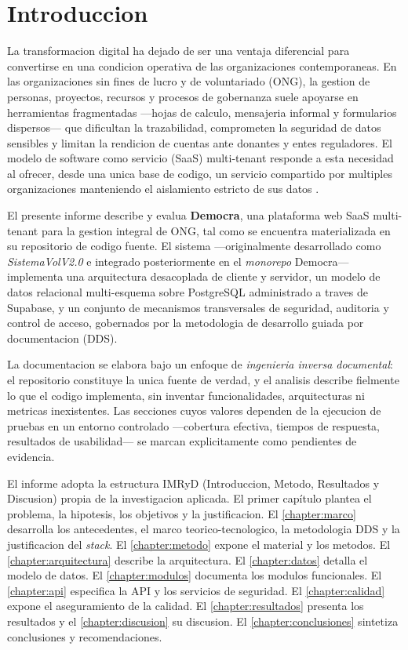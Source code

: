 \documentclass[11pt,a4paper,oneside]{report}
\begin{document}
\chapter*{Introduccion}
\label{chapter:introduccion}

La transformacion digital ha dejado de ser una ventaja diferencial para convertirse en una condicion
operativa de las organizaciones contemporaneas. En las organizaciones sin fines de lucro y de
voluntariado (ONG), la gestion de personas, proyectos, recursos y procesos de gobernanza suele
apoyarse en herramientas fragmentadas —hojas de calculo, mensajeria informal y formularios
dispersos— que dificultan la trazabilidad, comprometen la seguridad de datos sensibles y limitan la
rendicion de cuentas ante donantes y entes reguladores. El modelo de software como servicio (SaaS)
multi-tenant responde a esta necesidad al ofrecer, desde una unica base de codigo, un servicio
compartido por multiples organizaciones manteniendo el aislamiento estricto de sus datos
\citep{fowler2015, redhat2023}.

El presente informe describe y evalua \textbf{Democra}, una plataforma web SaaS multi-tenant para la
gestion integral de ONG, tal como se encuentra materializada en su repositorio de codigo fuente. El
sistema —originalmente desarrollado como \textit{SistemaVolV2.0} e integrado posteriormente en el
\textit{monorepo} Democra— implementa una arquitectura desacoplada de cliente y servidor, un modelo
de datos relacional multi-esquema sobre PostgreSQL administrado a traves de Supabase, y un conjunto
de mecanismos transversales de seguridad, auditoria y control de acceso, gobernados por la
metodologia de desarrollo guiada por documentacion (DDS).

La documentacion se elabora bajo un enfoque de \textit{ingenieria inversa documental}: el repositorio
constituye la unica fuente de verdad, y el analisis describe fielmente lo que el codigo implementa,
sin inventar funcionalidades, arquitecturas ni metricas inexistentes. Las secciones cuyos valores
dependen de la ejecucion de pruebas en un entorno controlado —cobertura efectiva, tiempos de
respuesta, resultados de usabilidad— se marcan explicitamente como pendientes de evidencia.

El informe adopta la estructura IMRyD (Introduccion, Metodo, Resultados y Discusion) propia de la
investigacion aplicada. El primer capítulo plantea el problema, la hipotesis, los
objetivos y la justificacion. El \autoref{chapter:marco} desarrolla los antecedentes, el marco
teorico-tecnologico, la metodologia DDS y la justificacion del \textit{stack}. El
\autoref{chapter:metodo} expone el material y los metodos. El \autoref{chapter:arquitectura} describe
la arquitectura. El \autoref{chapter:datos} detalla el modelo de datos. El \autoref{chapter:modulos}
documenta los modulos funcionales. El \autoref{chapter:api} especifica la API y los servicios de
seguridad. El \autoref{chapter:calidad} expone el aseguramiento de la calidad. El
\autoref{chapter:resultados} presenta los resultados y el \autoref{chapter:discusion} su discusion.
El \autoref{chapter:conclusiones} sintetiza conclusiones y recomendaciones.
\end{document}

